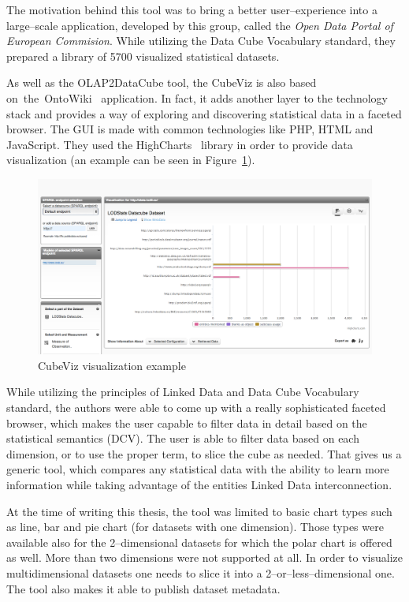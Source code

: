 The motivation behind this tool was to bring a better user--experience into a 
large--scale application, developed by this group, called the \emph{Open Data Portal of 
European Commision}. While utilizing the Data Cube Vocabulary standard, they 
prepared a library of 5700 visualized statistical datasets.

\begin{sloppypar}
As well as the OLAP2DataCube tool, the CubeViz is also based on~the~\mbox{OntoWiki}~\cite{ontowiki}
application. In fact, it adds another layer to the 
technology stack and provides a way of exploring and discovering statistical 
data in a faceted browser. The GUI is made with common technologies like PHP,
HTML and JavaScript. They used the HighCharts~\cite{highcharts} library in
order to provide data visualization (an example can be seen in Figure~\ref{fig:cubeviz}).
\end{sloppypar}

\begin{figure}
	\centering
	\includegraphics[width=140mm]{img/cubeviz.png}
	\caption{CubeViz visualization example}
	\label{fig:cubeviz}
\end{figure}

While utilizing the principles of Linked Data and Data Cube Vocabulary 
standard, the authors were able to come up with a really sophisticated faceted 
browser, which makes the user capable to filter data in detail based on the statistical 
semantics (DCV). The user is able to filter data based on each dimension, or to use the 
proper term, to slice the cube as needed. That gives us a generic tool, which 
compares any statistical data with the ability to learn more 
information while taking advantage of the entities Linked Data interconnection.

At the time of writing this thesis, the tool was limited to basic chart types
such as line, bar and pie chart (for datasets with one dimension). Those types 
were available also for the 2--dimensional datasets for which the polar 
chart is offered as well. More than two dimensions were not supported at all. In order to visualize 
multidimensional datasets one needs to slice it into a 2--or--less--dimensional one.
The tool also makes it able to publish dataset metadata.

